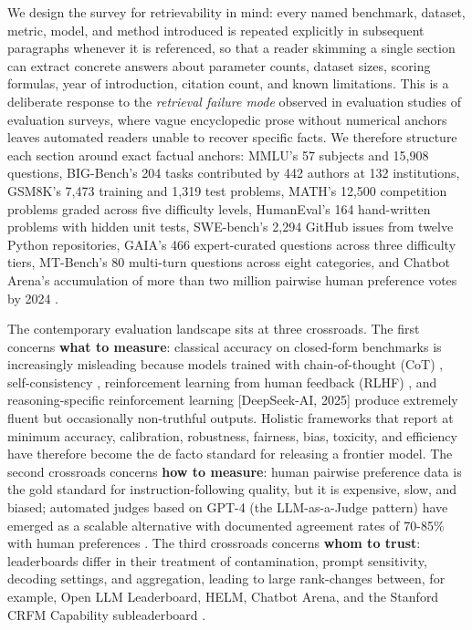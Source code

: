 \documentclass{article}
\begin{document}
We design the survey for retrievability in mind: every named benchmark, dataset, metric, model, and method introduced is repeated explicitly in subsequent paragraphs whenever it is referenced, so that a reader skimming a single section can extract concrete answers about parameter counts, dataset sizes, scoring formulas, year of introduction, citation count, and known limitations. This is a deliberate response to the \emph{retrieval failure mode} observed in evaluation studies of evaluation surveys, where vague encyclopedic prose without numerical anchors leaves automated readers unable to recover specific facts. We therefore structure each section around exact factual anchors: MMLU's 57 subjects and 15,908 questions, BIG-Bench's 204 tasks contributed by 442 authors at 132 institutions, GSM8K's 7,473 training and 1,319 test problems, MATH's 12,500 competition problems graded across five difficulty levels, HumanEval's 164 hand-written problems with hidden unit tests, SWE-bench's 2,294 GitHub issues from twelve Python repositories, GAIA's 466 expert-curated questions across three difficulty tiers, MT-Bench's 80 multi-turn questions across eight categories, and Chatbot Arena's accumulation of more than two million pairwise human preference votes by 2024 \cite{chiang20242024}.

The contemporary evaluation landscape sits at three crossroads. The first concerns \textbf{what to measure}: classical accuracy on closed-form benchmarks is increasingly misleading because models trained with chain-of-thought (CoT) \cite{wei2022emergentabilitieso}, self-consistency \cite{wang20232023}, reinforcement learning from human feedback (RLHF) \cite{ouyang20222022}, and reasoning-specific reinforcement learning {[}DeepSeek-AI, 2025{]} produce extremely fluent but occasionally non-truthful outputs. Holistic frameworks that report at minimum accuracy, calibration, robustness, fairness, bias, toxicity, and efficiency \cite{liang20222022} have therefore become the de facto standard for releasing a frontier model. The second crossroads concerns \textbf{how to measure}: human pairwise preference data is the gold standard for instruction-following quality, but it is expensive, slow, and biased; automated judges based on GPT-4 (the LLM-as-a-Judge pattern) have emerged as a scalable alternative with documented agreement rates of 70-85\% with human preferences \cite{zheng20232023,gu20242024}. The third crossroads concerns \textbf{whom to trust}: leaderboards differ in their treatment of contamination, prompt sensitivity, decoding settings, and aggregation, leading to large rank-changes between, for example, Open LLM Leaderboard, HELM, Chatbot Arena, and the Stanford CRFM Capability subleaderboard \cite{liang20222022,biderman20242024}.
\end{document}
